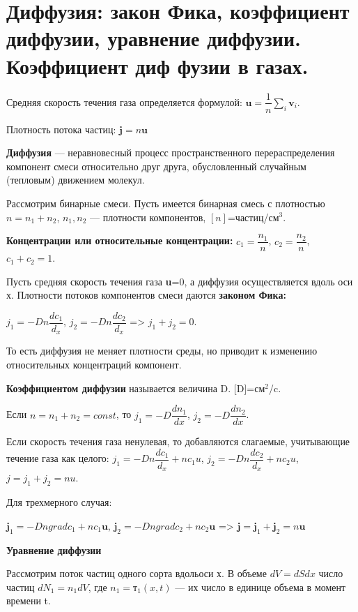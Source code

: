 \section{\normalsize Диффузия: закон Фика, коэффициент диффузии, уравнение диффузии. Коэффициент диф	фузии в газах.}
Средняя скорость течения газа определяется формулой: $\textbf{u}=\dfrac{1}{n}\sum_{i}^{}\textbf{v}_i$.

Плотность потока частиц: $\textbf{j}=n\textbf{u}$

\textbf{Диффузия} --- неравновесный процесс пространственного перераспределения компонент смеси относительно друг друга, обусловленный случайным (тепловым) движением молекул.

Рассмотрим бинарные смеси. Пусть имеется бинарная смесь с плотностью  $n=n_1+n_2$, $n_1, n_2$ --- плотности компонентов, $[n]$=частиц/см$^3$.

\textbf{Концентрации или относительные концентрации:} $c_1=\dfrac{n_1}{n}$, $c_2=\dfrac{n_2}{n}$, $c_1+c_2=1$.

Пусть средняя скорость течения газа \textbf{u}=0, а диффузия осуществляется вдоль оси х. Плотности потоков компонентов смеси даются \textbf{законом Фика:}

$j_1=-Dn\dfrac{dc_1}{d_x}$, $j_2=-Dn\dfrac{dc_2}{d_x}$ => $j_1+j_2=0$.

То есть диффузия не меняет плотности среды, но приводит к изменению относительных концентраций компонент.

\textbf{Коэффициентом диффузии} называется величина D. [D]=см$^2$/c.

Если $n=n_1+n_2=const$, то $j_1=-D\dfrac{dn_1}{dx}$, $j_2=-D\dfrac{dn_2}{dx}$.

Если скорость течения газа ненулевая, то добавляются слагаемые, учитывающие течение газа как целого: $j_1=-Dn\dfrac{dc_1}{d_x}+nc_1u$, $j_2=-Dn\dfrac{dc_2}{d_x}+nc_2u$, $j=j_1+j_2=nu$.

Для трехмерного случая: 

$\textbf{j}_1=-Dngradc_1+nc_1\textbf{u}$,\hspace{0.5 cm} $\textbf{j}_2=-Dngradc_2+nc_2\textbf{u}$ \hspace{0.5 cm}
=>\hspace{0.5 cm} $\textbf{j}=\textbf{j}_1+\textbf{j}_2=n\textbf{u}$

\textbf{Уравнение диффузии}

Рассмотрим поток частиц одного сорта вдольоси х. В объеме $dV=dSdx$ число частиц $dN_1=n_1dV$, где $n_1=т_1(x,t)$ --- их число в единице объема в момент времени t.

